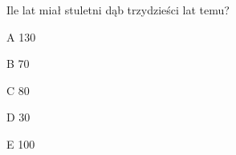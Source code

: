 \begin{tresc}
Ile lat miał stuletni dąb trzydzieści lat temu?
\end{tresc}
\begin{wariant}{A} 130 \end{wariant}
\begin{wariant}{B} 70 \end{wariant}
\begin{wariant}{C} 80 \end{wariant}
\begin{wariant}{D} 30 \end{wariant}
\begin{wariant}{E} 100 \end{wariant}
